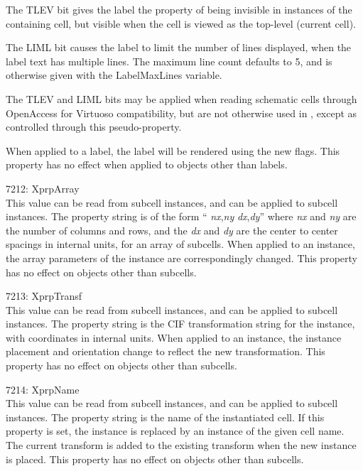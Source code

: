 \begin{description}
The {\vt TLEV} bit gives the label the property of being invisible in
instances of the containing cell, but visible when the cell is viewed
as the top-level (current cell).

The {\vt LIML} bit causes the label to limit the number of lines
displayed, when the label text has multiple lines.  The maximum line
count defaults to 5, and is otherwise given with the {\et
LabelMaxLines} variable.

\ifoa
The {\vt TLEV} and {\vt LIML} bits may be applied when reading
schematic cells through OpenAccess for Virtuoso compatibility, but are
not otherwise used in {\Xic}, except as controlled through this
pseudo-property.
\fi

When applied to a label, the label will be rendered using the new flags. 
This property has no effect when applied to objects other than labels.

\item{7212: {\et XprpArray}}\\
This value can be read from subcell instances, and can be applied to
subcell instances.  The property string is of the form ``{\it
nx\/},{\it ny} {\it dx\/},{\it dy}'' where {\it nx} and {\it ny} are
the number of columns and rows, and the {\it dx} and {\it dy} are the
center to center spacings in internal units, for an array of subcells. 
When applied to an instance, the array parameters of the instance are
correspondingly changed.  This property has no effect on objects other
than subcells.

\item{7213: {\et XprpTransf}}\\
This value can be read from subcell instances, and can be applied to
subcell instances.  The property string is the CIF transformation
string for the instance, with coordinates in internal units.  When
applied to an instance, the instance placement and orientation change
to reflect the new transformation.  This property has no effect on
objects other than subcells.

\item{7214: {\et XprpName}}\\
This value can be read from subcell instances, and can be applied to
subcell instances.  The property string is the name of the
instantiated cell.  If this property is set, the instance is replaced
by an instance of the given cell name.  The current transform is added
to the existing transform when the new instance is placed.  This
property has no effect on objects other than subcells.


\end{description}

